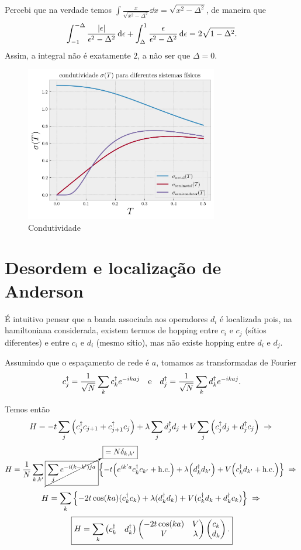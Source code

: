 \documentclass[a4paper,10pt]{article}
\begin{document}
\begin{itemize}
Percebi que na verdade temos $\int \frac{x}{\sqrt{x^2-\Delta^2}} \dd{x} = \sqrt{x^2 - \Delta^2}$, de maneira que
$$
\int_{-1}^{-\Delta} \frac{\abs{\epsilon}}{\epsilon^2-\Delta^2} \dd{\epsilon} + \int_{\Delta}^{1} \frac{\epsilon}{\epsilon^2-\Delta^2} \dd{\epsilon} = 2 \sqrt{1-\Delta^2}.
$$
Assim, a integral não é exatamente $2$, a não ser que $\Delta = 0$.

\begin{figure}[H]
\centering
\includegraphics[width=0.75\textwidth]{fig/sigma.png}
\caption{Condutividade}
\label{fig:sigma}
\end{figure}

\end{itemize}


\pagebreak

\section{Desordem e localização de Anderson}

É intuitivo pensar que a banda associada aos operadores $d_i$ é localizada pois, na hamiltoniana considerada, existem termos de hopping entre $c_i$ e $c_j$ (sítios diferentes) e entre $c_i$ e $d_i$ (mesmo sítio), mas não existe hopping entre $d_i$ e $d_j$.

Assumindo que o espaçamento de rede é $a$, tomamos as transformadas de Fourier
$$
c_j^\dagger = \frac{1}{\sqrt{N}} \sum_{k} c_k^\dagger e^{-ikaj} \quad \mathrm{e} \quad
d_j^\dagger = \frac{1}{\sqrt{N}} \sum_{k} d_k^\dagger e^{-ikaj}.
$$

Temos então
$$
H = -t \sum_{j} \qty(c_j^\dagger c_{j+1} + c_{j+1}^\dagger c_j) +
\lambda \sum_{j} d_j^\dagger d_j +
V \sum_{j} \qty(c_j^\dagger d_j + d_j^\dagger c_j) \; \Rightarrow \;
$$
$$
H = \frac{1}{N} \sum_{k,k'}
\cancelto{\boxed{= N \delta_{k,k'}}}{\boxed{\sum_{j} e^{-i(k-k')ja}}}
\qty{
-t \qty(e^{ik'a} c_k^\dagger c_{k'} + \text{h.c.}) +
\lambda \qty(d_k^\dagger d_{k'}) +
V \qty(c_k^\dagger d_{k'} + \text{h.c.})
} \; \Rightarrow \;
$$
$$
H = \sum_{k}
\qty{
-2t \cos(ka) (c_k^\dagger c_k) +
\lambda (d_k^\dagger d_k) +
V (c_k^\dagger d_k + d_k^\dagger c_k)
} \; \Rightarrow \;
$$
$$
\boxed{ H = \sum_{k}
\begin{pmatrix}
c_k^\dagger & d_k^\dagger
\end{pmatrix}
\begin{pmatrix}
-2t \cos(ka) & V \\
V & \lambda
\end{pmatrix}
\begin{pmatrix}
c_k \\ d_k
\end{pmatrix}. }
$$
\end{document}
